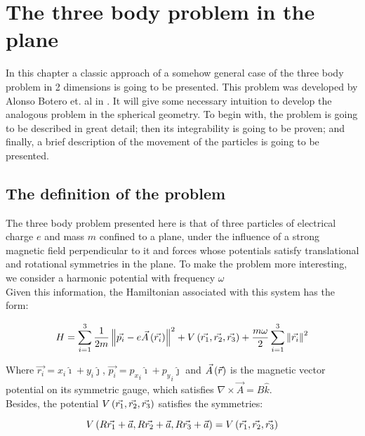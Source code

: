 \chapter{The three body problem in the plane}

In this chapter a classic approach of a somehow general case of the three body problem in 2 dimensions is going to be presented. This problem was developed by Alonso Botero et. al in \cite{alonso}. It will give some necessary intuition to develop the analogous problem in the spherical geometry. To begin with, the problem is going to be described in great detail; then its integrability is going to be proven; and finally, a brief description of the movement of the particles is going to be presented.\\

\section{The definition of the problem}

The three body problem presented here is that of three particles of electrical charge $e$ and mass $m$ confined to a plane, under the influence of a strong magnetic field perpendicular to it and forces whose potentials satisfy translational and rotational symmetries in the plane. To make the problem more interesting, we consider a harmonic potential with frequency $\omega$\\

Given this information, the Hamiltonian associated with this system has the form:

\begin{equation}
H = \sum_{i=1}^{3} \frac{1}{2m} \left\lVert  \vec{p_i} - 
e\vec{ A } \left( \vec{r_i} \right) \right\rVert^2
+ V \left(  \vec{r_1},\vec{r_2},\vec{r_3}  \right)
+\frac{m\omega}{2}\sum_{i=1}^{3} \left\lVert \vec{r_i} \right\rVert^2
\label{eq:ham2d}
\end{equation}

Where $\vec{r_i} = x_i \hat{\imath} + y_i \hat{\jmath}$, $\vec{p_i} = {p_x}_i\hat{\imath} + {p_y}_i\hat{\jmath}$ and $\vec{A}\left( \vec{r} \right)$ is the magnetic vector potential on its symmetric gauge, which satisfies $\nabla \times \vec{A} = B\hat{k}$.\\

Besides, the potential $V \left(  \vec{r_1},\vec{r_2},\vec{r_3}  \right)$ satisfies the symmetries:

\begin{equation}
V \left(  R\vec{r_1}+\vec{a},R\vec{r_2}+\vec{a},R\vec{r_3}+\vec{a}   \right)= V \left(  \vec{r_1},\vec{r_2},\vec{r_3}  \right)
\label{eq:vsym}
\end{equation}

